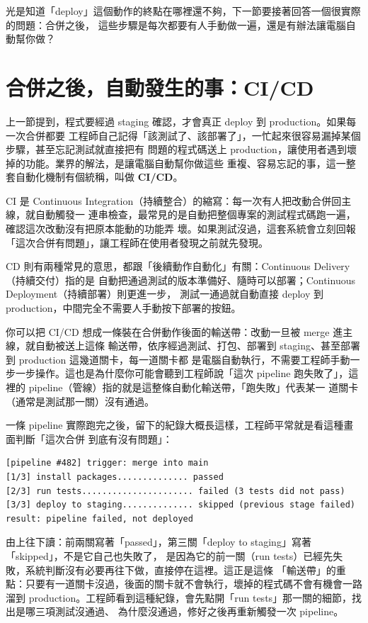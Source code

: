 光是知道「deploy」這個動作的終點在哪裡還不夠，下一節要接著回答一個很實際的問題：合併之後，
這些步驟是每次都要有人手動做一遍，還是有辦法讓電腦自動幫你做？

\section{合併之後，自動發生的事：CI/CD}
\label{sec:cicd}

上一節提到，程式要經過 staging 確認，才會真正 deploy 到 production。如果每一次合併都要
工程師自己記得「該測試了、該部署了」，一忙起來很容易漏掉某個步驟，甚至忘記測試就直接把有
問題的程式碼送上 production，讓使用者遇到壞掉的功能。業界的解法，是讓電腦自動幫你做這些
重複、容易忘記的事，這一整套自動化機制有個統稱，叫做 \textbf{CI/CD}。

CI 是 Continuous Integration（持續整合）的縮寫：每一次有人把改動合併回主線，就自動觸發一
連串檢查，最常見的是自動把整個專案的測試程式碼跑一遍，確認這次改動沒有把原本能動的功能弄
壞。如果測試沒過，這套系統會立刻回報「這次合併有問題」，讓工程師在使用者發現之前就先發現。

CD 則有兩種常見的意思，都跟「後續動作自動化」有關：Continuous Delivery（持續交付）指的是
自動把通過測試的版本準備好、隨時可以部署；Continuous Deployment（持續部署）則更進一步，
測試一通過就自動直接 deploy 到 production，中間完全不需要人手動按下部署的按鈕。

你可以把 CI/CD 想成一條裝在合併動作後面的輸送帶：改動一旦被 merge 進主線，就自動被送上這條
輸送帶，依序經過測試、打包、部署到 staging、甚至部署到 production 這幾道關卡，每一道關卡都
是電腦自動執行，不需要工程師手動一步一步操作。這也是為什麼你可能會聽到工程師說「這次
pipeline 跑失敗了」，這裡的 pipeline（管線）指的就是這整條自動化輸送帶，「跑失敗」代表某一
道關卡（通常是測試那一關）沒有通過。

一條 pipeline 實際跑完之後，留下的紀錄大概長這樣，工程師平常就是看這種畫面判斷「這次合併
到底有沒有問題」：

\begin{verbatim}
[pipeline #482] trigger: merge into main
[1/3] install packages.............. passed
[2/3] run tests...................... failed (3 tests did not pass)
[3/3] deploy to staging.............. skipped (previous stage failed)
result: pipeline failed, not deployed
\end{verbatim}

由上往下讀：前兩關寫著「passed」，第三關「deploy to staging」寫著「skipped」，不是它自己也失敗了，
是因為它的前一關（run tests）已經先失敗，系統判斷沒有必要再往下做，直接停在這裡。這正是這條
「輸送帶」的重點：只要有一道關卡沒過，後面的關卡就不會執行，壞掉的程式碼不會有機會一路溜到
production。工程師看到這種紀錄，會先點開「run tests」那一關的細節，找出是哪三項測試沒通過、
為什麼沒通過，修好之後再重新觸發一次 pipeline。

